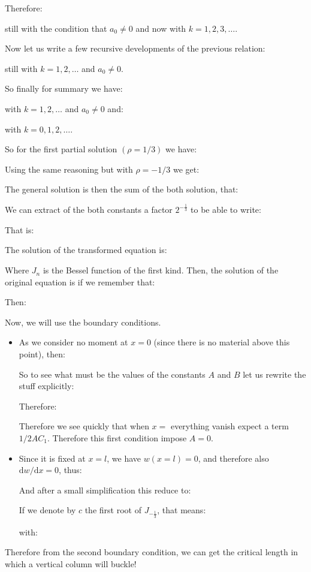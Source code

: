 	Therefore:
	
	still with the condition that $a_0\neq 0$ and now with $k=1,2,3,\ldots$.
	
	Now let us write a few recursive developments of the previous relation:
	
	still with $k=1,2,\dots$ and $a_0\neq 0$.
	
	So finally for summary we have:
	
	with $k=1,2,\dots$ and $a_0\neq 0$ and:
	
	with $k=0,1,2,\ldots$.
	
	So for the first partial solution $(\rho=1/3)$ we have:
	
	
	Using the same reasoning but with $\rho=-1/3$ we get:
	
	
	The general solution is then the sum of the both solution, that:
	
	We can extract of the both constants a factor $2^{-\frac{1}{3}}$ to be able to write:
	
	That is:
	
	The solution of the transformed equation is:
	
	Where $J_n$ is the Bessel function of the first kind. Then, the solution of the original equation is if we remember that:
	
	Then:
	
	Now, we will use the boundary conditions. 
	
	\begin{itemize}
		\item As we consider no moment at $x=0$ (since there is no material above this point), then:
		
		So to see what must be the values of the constants $A$ and $B$ let us rewrite the stuff explicitly:
		
		Therefore:
		
		Therefore we see quickly that when $x=$ everything vanish expect a term $1/2AC_1$. Therefore this first condition impose $A=0$.
	
		\item Since it is fixed at $x=l$, we have  $w(x=l)=0$, and therefore also $\mathrm{d}w/\mathrm{d}x=0$, thus:
		
		And after a small simplification this reduce to:
		
		If we denote by $c$ the first root of $J_{-\frac {1}{3}}$, that means:
		
		with:
		
	\end{itemize}
	Therefore from the second boundary condition, we can get the critical length in which a vertical column will buckle!
	
